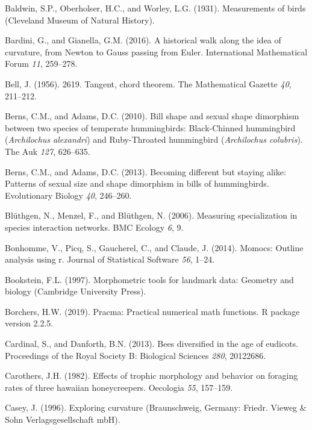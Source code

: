 \documentclass[]{article}
\begin{document}
\leavevmode\hypertarget{ref-baldwin_1931}{}%
Baldwin, S.P., Oberholser, H.C., and Worley, L.G. (1931). Measurements
of birds (Cleveland Museum of Natural History).

\leavevmode\hypertarget{ref-bardini_2016}{}%
Bardini, G., and Gianella, G.M. (2016). A historical walk along the idea
of curvature, from Newton to Gauss passing from Euler. International
Mathematical Forum \emph{11}, 259--278.

\leavevmode\hypertarget{ref-bell_1956}{}%
Bell, J. (1956). 2619. Tangent, chord theorem. The Mathematical Gazette
\emph{40}, 211--212.

\leavevmode\hypertarget{ref-berns_2010}{}%
Berns, C.M., and Adams, D.C. (2010). Bill shape and sexual shape
dimorphism between two species of temperate hummingbirds: Black-Chinned
hummingbird (\emph{Archilochus alexandri}) and Ruby-Throated hummingbird
(\emph{Archilochus colubris}). The Auk \emph{127}, 626--635.

\leavevmode\hypertarget{ref-berns_2013}{}%
Berns, C.M., and Adams, D.C. (2013). Becoming different but staying
alike: Patterns of sexual size and shape dimorphism in bills of
hummingbirds. Evolutionary Biology \emph{40}, 246--260.

\leavevmode\hypertarget{ref-bluthgen_2006}{}%
Blüthgen, N., Menzel, F., and Blüthgen, N. (2006). Measuring
specialization in species interaction networks. BMC Ecology \emph{6}, 9.

\leavevmode\hypertarget{ref-bonhomme_2014}{}%
Bonhomme, V., Picq, S., Gaucherel, C., and Claude, J. (2014). Momocs:
Outline analysis using r. Journal of Statistical Software \emph{56},
1--24.

\leavevmode\hypertarget{ref-bookstein_1997}{}%
Bookstein, F.L. (1997). Morphometric tools for landmark data: Geometry
and biology (Cambridge University Press).

\leavevmode\hypertarget{ref-borchers_2019}{}%
Borchers, H.W. (2019). Pracma: Practical numerical math functions. R
package version 2.2.5.

\leavevmode\hypertarget{ref-cardinal_2013}{}%
Cardinal, S., and Danforth, B.N. (2013). Bees diversified in the age of
eudicots. Proceedings of the Royal Society B: Biological Sciences
\emph{280}, 20122686.

\leavevmode\hypertarget{ref-carothers_1982}{}%
Carothers, J.H. (1982). Effects of trophic morphology and behavior on
foraging rates of three hawaiian honeycreepers. Oecologia \emph{55},
157--159.

\leavevmode\hypertarget{ref-casey_1996}{}%
Casey, J. (1996). Exploring curvature (Braunschweig, Germany: Friedr.
Vieweg \& Sohn Verlagsgesellschaft mbH).
\end{document}
